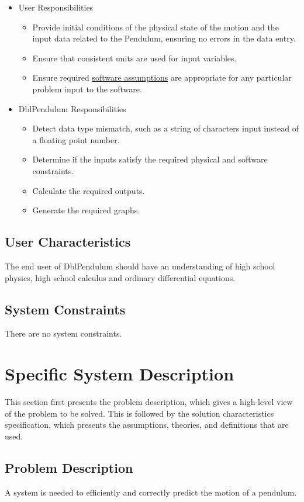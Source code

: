 \documentclass[12pt]{article}
\begin{document}
\begin{itemize}
\item{User Responsibilities}
\begin{itemize}
\item{Provide initial conditions of the physical state of the motion and the input data related to the Pendulum, ensuring no errors in the data entry.}
\item{Ensure that consistent units are used for input variables.}
\item{Ensure required \hyperref[Sec:Assumps]{software assumptions} are appropriate for any particular problem input to the software.}
\end{itemize}
\item{DblPendulum Responsibilities}
\begin{itemize}
\item{Detect data type mismatch, such as a string of characters input instead of a floating point number.}
\item{Determine if the inputs satisfy the required physical and software constraints.}
\item{Calculate the required outputs.}
\item{Generate the required graphs.}
\end{itemize}
\end{itemize}
\subsection{User Characteristics}
\label{Sec:UserChars}
The end user of DblPendulum should have an understanding of high school physics, high school calculus and ordinary differential equations.

\subsection{System Constraints}
\label{Sec:SysConstraints}
There are no system constraints.

\section{Specific System Description}
\label{Sec:SpecSystDesc}
This section first presents the problem description, which gives a high-level view of the problem to be solved. This is followed by the solution characteristics specification, which presents the assumptions, theories, and definitions that are used.

\subsection{Problem Description}
\label{Sec:ProbDesc}
A system is needed to efficiently and correctly predict the motion of a pendulum.
\end{document}

